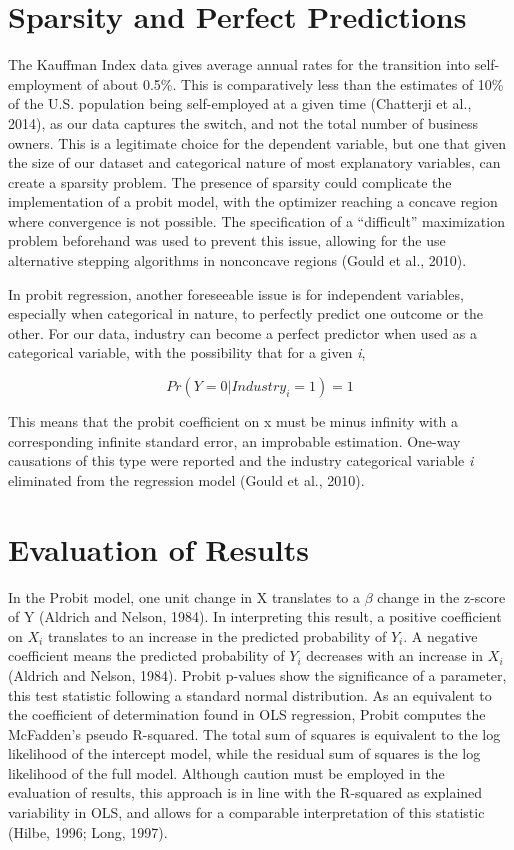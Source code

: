 \section{Sparsity and Perfect Predictions}

The Kauffman Index data gives average annual rates for the transition into self-employment of about 0.5\%. This is comparatively less than the estimates of 10\% of the U.S. population being self-employed at a given time (Chatterji et al., 2014), as our data captures the switch, and not the total number of business owners. This is a legitimate choice for the dependent variable, but one that given the size of our dataset and categorical nature of most explanatory variables, can create a sparsity problem. The presence of sparsity could complicate the implementation of a probit model, with the optimizer reaching a concave region where convergence is not possible. The specification of a “difficult” maximization problem beforehand was used to prevent this issue, allowing for the use alternative stepping algorithms in nonconcave regions (Gould et al., 2010).

In probit regression, another foreseeable issue is for independent variables, especially when categorical in nature, to perfectly predict one outcome or the other. For our data, industry can become a perfect predictor when used as a categorical variable, with the possibility that for a given \textit{i},

\begin{dmath}
Pr(Y = 0 | Industry_i = 1) = 1
\end{dmath}

This means that the probit coefficient on x must be minus infinity with a corresponding infinite standard error, an improbable estimation. One-way causations of this type were reported and the industry categorical variable \textit{i} eliminated from the regression model (Gould et al., 2010). 

\section{Evaluation of Results}

In the Probit model, one unit change in X translates to a $\beta$ change in the z-score of Y (Aldrich and Nelson, 1984). In interpreting this result, a positive coefficient on $X_i$ translates to an increase in the predicted probability of $Y_i$. A negative coefficient means the predicted probability of $Y_i$ decreases with an increase in $X_i$ (Aldrich and Nelson, 1984). Probit p-values show the significance of a parameter, this test statistic following a standard normal distribution. As an equivalent to the coefficient of determination found in OLS regression, Probit computes the McFadden's pseudo R-squared. The total sum of squares is equivalent to the log likelihood of the intercept model, while the residual sum of squares is the log likelihood of the full model. Although caution must be employed in the evaluation of results, this approach is in line with the R-squared as explained variability in OLS, and allows for a comparable interpretation of this statistic (Hilbe, 1996; Long, 1997). 

